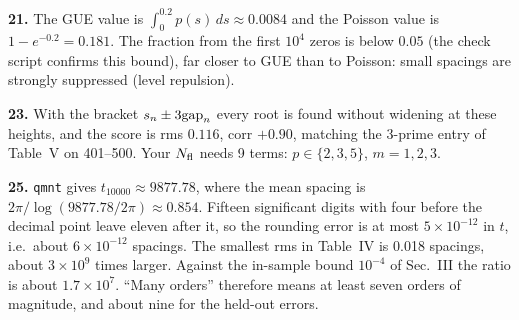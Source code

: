 \textbf{21.} The GUE value is $\int_0^{0.2}p(s)\,ds\approx0.0084$ and the Poisson value is $1-e^{-0.2}=0.181$. The fraction from the first $10^4$ zeros is below $0.05$ (the check script confirms this bound), far closer to GUE than to Poisson: small spacings are strongly suppressed (level repulsion).

\textbf{23.} With the bracket $s_n\pm3\mathrm{gap}_n$ every root is found without widening at these heights, and the score is rms $0.116$, corr $+0.90$, matching the 3-prime entry of Table~V on 401--500. Your $N_{\mathrm{fl}}$ needs 9 terms: $p\in\{2,3,5\}$, $m=1,2,3$.

\textbf{25.} \texttt{qmnt} gives $t_{10000}\approx9877.78$, where the mean spacing is $2\pi/\log(9877.78/2\pi)\approx0.854$. Fifteen significant digits with four before the decimal point leave eleven after it, so the rounding error is at most $5\times10^{-12}$ in $t$, i.e.\ about $6\times10^{-12}$ spacings. The smallest rms in Table~IV is 0.018 spacings, about $3\times10^9$ times larger. Against the in-sample bound $10^{-4}$ of Sec.~III the ratio is about $1.7\times10^7$. ``Many orders'' therefore means at least seven orders of magnitude, and about nine for the held-out errors.
